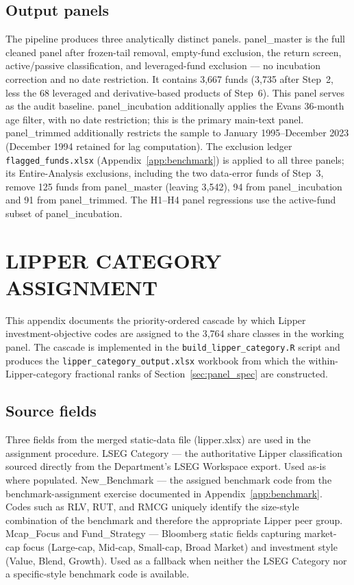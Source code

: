 \documentclass[12pt, oneside]{report}
\begin{document}


\section{Output panels}
\label{sec:output_panels}

\noindent The pipeline produces three analytically distinct panels.
panel\_master is the full cleaned panel after frozen-tail removal,
empty-fund exclusion, the return screen, active/passive classification,
and leveraged-fund exclusion --- no incubation correction and no date
restriction. It contains 3{,}667 funds (3{,}735 after Step~2, less the
68 leveraged and derivative-based products of Step~6). This panel serves as the
audit baseline. panel\_incubation additionally applies the Evans 36-month
age filter, with no date restriction; this is the primary main-text panel.
panel\_trimmed additionally restricts the sample to January
1995--December 2023 (December 1994 retained for lag computation). The
exclusion ledger \texttt{flagged\_funds.xlsx} (Appendix~\ref{app:benchmark})
is applied to all three panels; its Entire-Analysis exclusions, including
the two data-error funds of Step~3, remove 125 funds from panel\_master
(leaving 3{,}542), 94 from panel\_incubation and 91 from
panel\_trimmed. The H1--H4 panel regressions use the
active-fund subset of panel\_incubation.

\chapter{LIPPER CATEGORY ASSIGNMENT}
\label{app:lipper_assignment}

\noindent This appendix documents the priority-ordered cascade by
which Lipper investment-objective codes are assigned to the 3{,}764
share classes in the working panel. The cascade is implemented in
the \texttt{build\_lipper\_category.R} script and produces the
\texttt{lipper\_category\_output.xlsx} workbook from which the
within-Lipper-category fractional ranks of
Section~\ref{sec:panel_spec} are constructed.

\section{Source fields}
\label{sec:lipper_sources}

\noindent Three fields from the merged static-data file
(lipper.xlsx) are used in the assignment procedure.
LSEG Category --- the authoritative Lipper classification
sourced directly from the Department's LSEG Workspace export. Used
as-is where populated. New\_Benchmark --- the assigned
benchmark code from the benchmark-assignment exercise documented in
Appendix~\ref{app:benchmark}. Codes such as RLV, RUT, and RMCG
uniquely identify the size-style combination of the benchmark and
therefore the appropriate Lipper peer group. Mcap\_Focus and
Fund\_Strategy --- Bloomberg static fields capturing market-cap
focus (Large-cap, Mid-cap, Small-cap, Broad Market) and investment
style (Value, Blend, Growth). Used as a fallback when neither the
LSEG Category nor a specific-style benchmark code is available.
\end{document}
